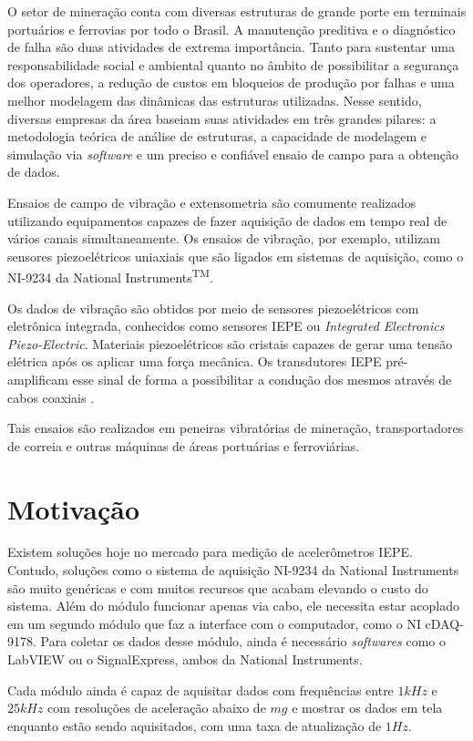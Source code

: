 \documentclass[
	12pt,				%
	openright,			%
	twoside,			%
	a4paper,			%
	english,			%
	french,				%
	spanish,			%
	brazil,				%
	]{abntex2}
\begin{document}
		O setor de mineração conta com diversas estruturas de grande porte em terminais portuários e ferrovias por todo o Brasil. A manutenção preditiva e o diagnóstico de falha são duas atividades de extrema importância. Tanto para sustentar uma responsabilidade social e ambiental quanto no âmbito de possibilitar a segurança dos operadores, a redução de custos em bloqueios de produção por falhas e uma melhor modelagem das dinâmicas das estruturas utilizadas. Nesse sentido, diversas empresas da área baseiam suas atividades em três grandes pilares: a metodologia teórica de análise de estruturas, a capacidade de modelagem e simulação via \textit{software} e um preciso e confiável ensaio de campo para a obtenção de dados.
		
		Ensaios de campo de vibração e extensometria são comumente realizados utilizando equipamentos capazes de fazer aquisição de dados em tempo real de vários canais simultaneamente. Os ensaios de vibração, por exemplo, utilizam sensores piezoelétricos uniaxiais que são ligados em sistemas de aquisição, como o NI-9234 da National Instruments\textsuperscript{TM}.

		Os dados de vibração são obtidos por meio de sensores piezoelétricos com eletrônica integrada, conhecidos como sensores IEPE ou \textit{Integrated Electronics Piezo-Electric}. Materiais piezoelétricos são cristais capazes de gerar uma tensão elétrica após os aplicar uma força mecânica. Os transdutores IEPE pré-amplificam esse sinal de forma a possibilitar a condução dos mesmos através de cabos coaxiais \cite{iepeCircuit}.

		Tais ensaios são realizados em peneiras vibratórias de mineração, transportadores de correia e outras máquinas de áreas portuárias e ferroviárias.
	\section{Motivação}

		Existem soluções hoje no mercado para medição de acelerômetros IEPE. Contudo, soluções como o sistema de aquisição NI-9234 da National Instruments são muito genéricas e com muitos recursos que acabam elevando o custo do sistema. Além do módulo funcionar apenas via cabo, ele necessita estar acoplado em um segundo módulo que faz a interface com o computador, como o NI cDAQ-9178. Para coletar os dados desse módulo, ainda é necessário \textit{softwares} como o LabVIEW ou o SignalExpress, ambos da National Instruments. 
		
		Cada módulo ainda é capaz de aquisitar dados com frequências entre $1kHz$ e $25kHz$ com resoluções de aceleração abaixo de $mg$ e mostrar os dados em tela enquanto estão sendo aquisitados, com uma taxa de atualização de $1Hz$.
\end{document}
